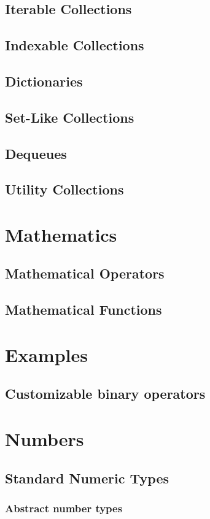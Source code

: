     \section{Iterable Collections}
    \section{Indexable Collections}
    \section{Dictionaries}
    \section{Set-Like Collections}
    \section{Dequeues}
    \section{Utility Collections}
  \chapter{Mathematics}
    \section{Mathematical Operators}
    \section{Mathematical Functions}
  \chapter{Examples}
    \section{Customizable binary operators}
  \chapter{Numbers}
    \section{Standard Numeric Types}
    \subsection{Abstract number types}
